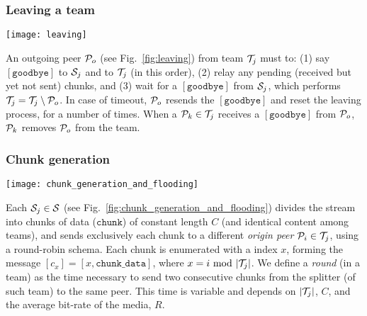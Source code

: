 \subsubsection{Leaving a team}
\label{dbs:leaving}
\begin{figure*}
  \texttt{[image: leaving]}
  \caption{Peer leaving.\label{fig:leaving}}
\end{figure*}
An outgoing peer ${\cal P}_o$ (see Fig.~\ref{fig:leaving}) from team
${\cal T}_j$ must to: (1) say $[\mathtt{goodbye}]$ to ${\cal S}_j$ and
to ${\cal T}_j$
(in this order), (2) relay any pending (received but
yet not sent) chunks, and (3) wait for a $[\mathtt{goodbye}]$ from
${\cal S}_j$, which performs ${\cal T}_j = {\cal T}_j \setminus {\cal
  P}_o$. In case of timeout, ${\cal P}_o$ resends the
$[\mathtt{goodbye}]$ and reset the leaving process, for a number of
times. When a ${\cal P}_k\in {\cal T}_j$
receives a
$[\mathtt{goodbye}]$ from ${\cal P}_o$, ${\cal P}_k$ removes
${\cal P}_o$ from the team.

\begin{comment}
calls the Procedure \emph{Joining a
  team} (for $K=1$), to find a new neighbor. Finally, ${\cal S}_j$
sends to ${\cal P}_o$ a $[\mathtt{goodbye}]$ and performs ${\cal T}_j
= {\cal T}_j \setminus \{{\cal P}_o\}$.
\end{comment}

\subsubsection{Chunk generation}
\label{dbs:chunk_generation}
\begin{figure*}
  \texttt{[image: chunk\_generation\_and\_flooding]}
  \caption{Chunk generation and
    flooding.\label{fig:chunk_generation_and_flooding}}
\end{figure*}
Each ${\cal S}_j\in{\cal S}$ (see
Fig.~\ref{fig:chunk_generation_and_flooding}) divides the stream into
chunks of data ($\mathtt{chunk}$) of constant length $C$ (and
identical content among teams), and sends exclusively each chunk to a
different \emph{origin peer} ${\cal P}_i\in{\cal T}_j$, using a
round-robin schema. Each chunk is enumerated with a index $x$, forming
the message $[c_x]=[x,\mathtt{chunk\_data}]$, where
$x=i~\mathrm{mod}~|{\cal T}_j|$. We define a \emph{round} (in a team)
as the time necessary to send two consecutive chunks from the splitter
(of such team) to the same peer. This time is variable and depends on
$|{\cal T}_j|$, $C$, and the average bit-rate of the media, $R$.

